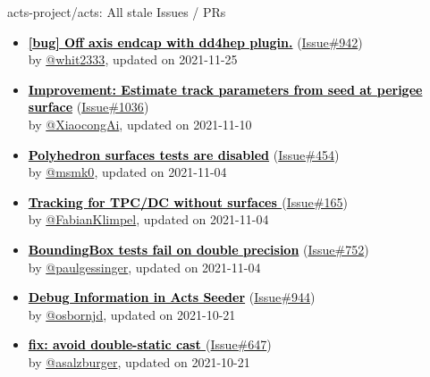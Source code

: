 \documentclass{beamer}
\begin{document}
\begin{frame}[allowframebreaks]{ acts-project/acts: All stale Issues / PRs}
\begin{itemize}
    \item
    \textbf{\href{https://github.com/acts-project/acts/issues/942}{\textcolor{black}{[bug] Off axis endcap with dd4hep plugin.}}}
    (\href{https://github.com/acts-project/acts/issues/942}{Issue\#942}) \\
    by \href{https://github.com/whit2333}{ @whit2333}, updated on 2021-11-25

    \item
    \textbf{\href{https://github.com/acts-project/acts/issues/1036}{\textcolor{black}{Improvement: Estimate track parameters from seed at perigee surface}}}
    (\href{https://github.com/acts-project/acts/issues/1036}{Issue\#1036}) \\
    by \href{https://github.com/XiaocongAi}{ @XiaocongAi}, updated on 2021-11-10

    \item
    \textbf{\href{https://github.com/acts-project/acts/issues/454}{\textcolor{black}{Polyhedron surfaces tests are disabled}}}
    (\href{https://github.com/acts-project/acts/issues/454}{Issue\#454}) \\
    by \href{https://github.com/msmk0}{ @msmk0}, updated on 2021-11-04

    \item
    \textbf{\href{https://github.com/acts-project/acts/issues/165}{\textcolor{black}{Tracking for TPC/DC without surfaces }}}
    (\href{https://github.com/acts-project/acts/issues/165}{Issue\#165}) \\
    by \href{https://github.com/FabianKlimpel}{ @FabianKlimpel}, updated on 2021-11-04

    \item
    \textbf{\href{https://github.com/acts-project/acts/issues/752}{\textcolor{black}{BoundingBox tests fail on double precision}}}
    (\href{https://github.com/acts-project/acts/issues/752}{Issue\#752}) \\
    by \href{https://github.com/paulgessinger}{ @paulgessinger}, updated on 2021-11-04

    \item
    \textbf{\href{https://github.com/acts-project/acts/issues/944}{\textcolor{black}{Debug Information in Acts Seeder}}}
    (\href{https://github.com/acts-project/acts/issues/944}{Issue\#944}) \\
    by \href{https://github.com/osbornjd}{ @osbornjd}, updated on 2021-10-21

    \item
    \textbf{\href{https://github.com/acts-project/acts/issues/647}{\textcolor{black}{fix: avoid double-static cast }}}
    (\href{https://github.com/acts-project/acts/issues/647}{Issue\#647}) \\
    by \href{https://github.com/asalzburger}{ @asalzburger}, updated on 2021-10-21

  \end{itemize}
\end{frame}
\end{document}
